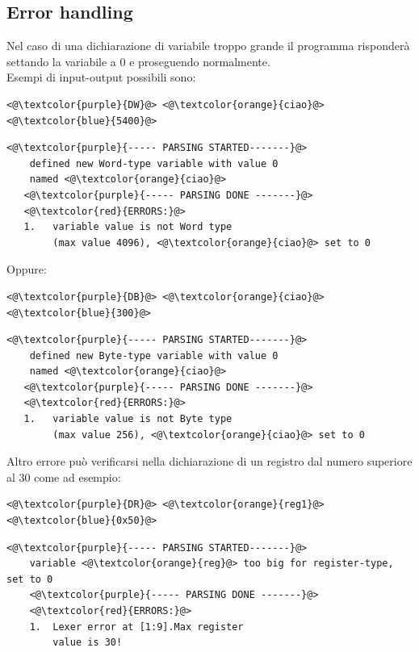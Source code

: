 \subsection{Error handling}
Nel caso di una dichiarazione di variabile troppo grande il programma risponderà settando la variabile a 0 e proseguendo normalmente.
\\Esempi di input-output possibili sono:
\begin{lstlisting}[caption=input]
    <@\textcolor{purple}{DW}@> <@\textcolor{orange}{ciao}@> <@\textcolor{blue}{5400}@>
\end{lstlisting}
\begin{lstlisting}[caption=output]
   <@\textcolor{purple}{----- PARSING STARTED-------}@>
    defined new Word-type variable with value 0 
    named <@\textcolor{orange}{ciao}@>
   <@\textcolor{purple}{----- PARSING DONE -------}@>
   <@\textcolor{red}{ERRORS:}@>
   1.	variable value is not Word type
        (max value 4096), <@\textcolor{orange}{ciao}@> set to 0
\end{lstlisting}
Oppure:
\begin{lstlisting}[caption=input]
    <@\textcolor{purple}{DB}@> <@\textcolor{orange}{ciao}@> <@\textcolor{blue}{300}@>
\end{lstlisting}
\begin{lstlisting}[caption=output]
   <@\textcolor{purple}{----- PARSING STARTED-------}@>
    defined new Byte-type variable with value 0 
    named <@\textcolor{orange}{ciao}@>
   <@\textcolor{purple}{----- PARSING DONE -------}@>
   <@\textcolor{red}{ERRORS:}@>
   1.	variable value is not Byte type
        (max value 256), <@\textcolor{orange}{ciao}@> set to 0
\end{lstlisting}
\newpage
Altro errore può verificarsi nella dichiarazione di un registro dal numero superiore al 30 come ad esempio:

\begin{lstlisting}[caption=input]
    <@\textcolor{purple}{DR}@> <@\textcolor{orange}{reg1}@> <@\textcolor{blue}{0x50}@>
\end{lstlisting}

\begin{lstlisting}[caption=output]
    <@\textcolor{purple}{----- PARSING STARTED-------}@>
    variable <@\textcolor{orange}{reg}@> too big for register-type, set to 0
    <@\textcolor{purple}{----- PARSING DONE -------}@>
    <@\textcolor{red}{ERRORS:}@>
    1.	Lexer error at [1:9].Max register 
        value is 30!
\end{lstlisting}

